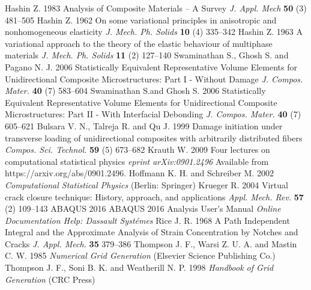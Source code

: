 \begin{thebibliography}{9}
Hashin Z. 1983 Analysis of Composite Materials -- A Survey {\it J. Appl. Mech} {\bf 50} (3) 481--505
Hashin Z. 1962 On some variational principles in anisotropic and nonhomogeneous elasticity {\it J. Mech. Ph. Solids} {\bf 10} (4) 335--342
Hashin Z. 1963 A variational approach to the theory of the elastic behaviour of multiphase materials {\it J. Mech. Ph. Solids} {\bf 11} (2) 127--140
Swaminathan S., Ghosh S. and Pagano N. J. 2006 Statistically Equivalent Representative Volume Elements for Unidirectional Composite Microstructures: Part I - Without Damage {\it J. Compos. Mater.} {\bf 40} (7) 583--604
Swaminathan S.and Ghosh S. 2006 Statistically Equivalent Representative Volume Elements for Unidirectional Composite Microstructures: Part II - With Interfacial Debonding {\it J. Compos. Mater.} {\bf 40} (7) 605--621
Bulsara V. N., Talreja R. and Qu J. 1999 Damage initiation under transverse loading of unidirectional composites with arbitrarily distributed fibers {\it Compos. Sci. Technol.} {\bf 59} (5) 673--682
Krauth W. 2009 Four lectures on computational statistical physics {\it eprint arXiv:0901.2496} Available from https://arxiv.org/abs/0901.2496.
Hoffmann K. H. and Schreiber M. 2002 {\it Computational Statistical Physics} (Berlin: Springer)
Krueger R. 2004 Virtual crack closure technique: History, approach, and applications {\it Appl. Mech. Rev.} {\bf 57} (2) 109--143
 ABAQUS 2016 ABAQUS 2016 Analysis User's Manual {\it Online Documentation Help: Dassault Syst\'emes} 
Rice J. R. 1968 A Path Independent Integral and the Approximate Analysis of Strain Concentration by Notches and Cracks {\it J. Appl. Mech.} {\bf 35} 379--386
Thompson J. F., Warsi Z. U. A. and Mastin C. W. 1985 {\it Numerical Grid Generation} (Elsevier Science Publishing Co.)
Thompson J. F., Soni B. K. and Weatherill N. P. 1998 {\it Handbook of Grid Generation} (CRC Press)
\end{thebibliography}